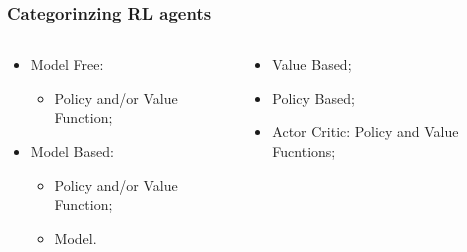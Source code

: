 \begin{frame}
    \frametitle{Categorinzing RL agents}
    \begin{columns}
        \begin{column}{0.5\textwidth}
            \begin{itemize}
                \item Model Free:
                \begin{itemize}
                    \item Policy and/or Value Function;
                \end{itemize}
                \item Model Based:
                \begin{itemize}
                    \item Policy and/or Value Function;
                    \item Model.
                \end{itemize}       
            \end{itemize}
        \end{column}

        \begin{column}{0.5\textwidth}
            \begin{itemize}
                \item Value Based;
                \item Policy Based;
                \item Actor Critic: Policy and Value Fucntions;
            \end{itemize}  
        \end{column}

    \end{columns}

\end{frame}